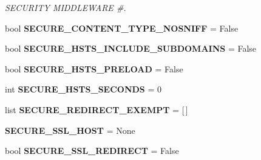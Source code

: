 \begin{DoxyCompactItemize}
\begin{DoxyCompactList}\small\item\em S\+E\+C\+U\+R\+I\+TY M\+I\+D\+D\+L\+E\+W\+A\+RE \#. \end{DoxyCompactList}\item 
\mbox{\label{namespacedjango_1_1conf_1_1global__settings_a09e7b0e83310c65c6a9733e32f3da4c8}} 
bool {\bfseries S\+E\+C\+U\+R\+E\+\_\+\+C\+O\+N\+T\+E\+N\+T\+\_\+\+T\+Y\+P\+E\+\_\+\+N\+O\+S\+N\+I\+FF} = False
\item 
\mbox{\label{namespacedjango_1_1conf_1_1global__settings_a4568855fcf3c98b3d89d320dc367e009}} 
bool {\bfseries S\+E\+C\+U\+R\+E\+\_\+\+H\+S\+T\+S\+\_\+\+I\+N\+C\+L\+U\+D\+E\+\_\+\+S\+U\+B\+D\+O\+M\+A\+I\+NS} = False
\item 
\mbox{\label{namespacedjango_1_1conf_1_1global__settings_a42b569c7f6761b398c8e72b549d27d9e}} 
bool {\bfseries S\+E\+C\+U\+R\+E\+\_\+\+H\+S\+T\+S\+\_\+\+P\+R\+E\+L\+O\+AD} = False
\item 
\mbox{\label{namespacedjango_1_1conf_1_1global__settings_ac912deef29e321f265bf09fdaa7f4c2b}} 
int {\bfseries S\+E\+C\+U\+R\+E\+\_\+\+H\+S\+T\+S\+\_\+\+S\+E\+C\+O\+N\+DS} = 0
\item 
\mbox{\label{namespacedjango_1_1conf_1_1global__settings_a915a275871c49e3093f1c07a2fa6dd76}} 
list {\bfseries S\+E\+C\+U\+R\+E\+\_\+\+R\+E\+D\+I\+R\+E\+C\+T\+\_\+\+E\+X\+E\+M\+PT} = \mbox{[}$\,$\mbox{]}
\item 
\mbox{\label{namespacedjango_1_1conf_1_1global__settings_a7fa1aad324a151dfb9183ab0bba5a88b}} 
{\bfseries S\+E\+C\+U\+R\+E\+\_\+\+S\+S\+L\+\_\+\+H\+O\+ST} = None
\item 
\mbox{\label{namespacedjango_1_1conf_1_1global__settings_aad9c00c7fc32f60405bfa5ad746ea9e5}} 
bool {\bfseries S\+E\+C\+U\+R\+E\+\_\+\+S\+S\+L\+\_\+\+R\+E\+D\+I\+R\+E\+CT} = False
\end{DoxyCompactItemize}


